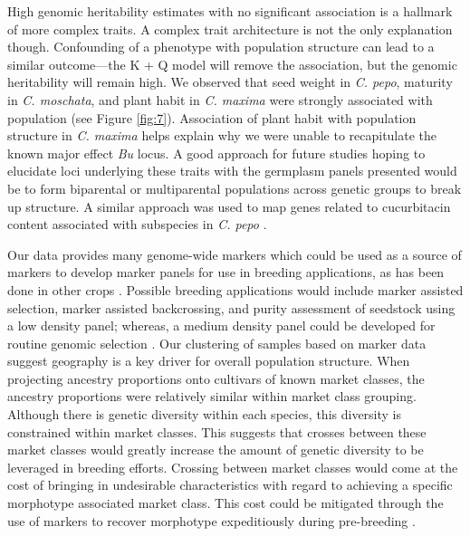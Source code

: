 \documentclass[utf8]{FrontiersinHarvard} %
\begin{document}
High genomic heritability estimates with no significant association is a hallmark of more complex traits. A complex trait architecture is not the only explanation though. Confounding of a phenotype with population structure can lead to a similar outcome---the K + Q model will remove the association, but the genomic heritability will remain high. We observed that seed weight in \textit{C. pepo}, maturity in \textit{C. moschata}, and plant habit in \textit{C. maxima} were strongly associated with population (see Figure \ref{fig:7}). Association of plant habit with population structure in \textit{C. maxima} helps explain why we were unable to recapitulate the known major effect \textit{Bu} locus. {\color{red}A good approach for future studies hoping to elucidate loci underlying these traits with the germplasm panels presented would be to form biparental or multiparental populations across genetic groups to break up structure.} A similar approach was used to map genes related to cucurbitacin content associated with subspecies in \textit{C. pepo} \citep{Brzozowski2020}.

Our data provides many genome-wide markers which could be used as {\color{red} a source of markers} to develop marker panels for use in breeding applications, as has been done in other crops \citep{Arbelaez2019}. Possible breeding applications would include marker assisted selection, marker assisted backcrossing, and purity assessment of seedstock using a low density panel; whereas, a medium density panel could be developed for routine genomic selection \citep{Cerioli2022}. Our clustering of samples based on marker data suggest geography is a key driver for overall population structure. When projecting ancestry proportions onto cultivars of known market classes, the ancestry proportions were relatively similar within market class grouping. Although there is genetic diversity within each species, this diversity is constrained within market classes. This suggests that crosses between these market classes would greatly increase the amount of genetic diversity to be leveraged in breeding efforts. Crossing between market classes would come at the cost of bringing in undesirable characteristics with regard to achieving a specific morphotype associated market class. This cost could be mitigated through the use of markers to recover morphotype expeditiously during pre-breeding \citep{Cobb2019}. 
\end{document}
